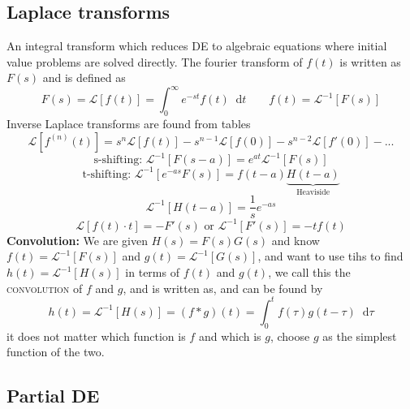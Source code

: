 \documentclass[a4paper, 10pt]{article}
\newcommand*\diff{\mathop{}\!\mathrm{d}}
\begin{document}
\begin{multicols*}{3}
\begin{mdframed}
\subsection*{Laplace transforms}
\end{mdframed}
An integral transform which reduces DE to algebraic equations where initial value problems are solved directly. The fourier transform of $f(t)$ is written as $F(s)$ and is defined as
$$ F(s) = \mathcal{L}\left[ f(t) \right] = \int_0^\infty e^{-st} f(t) \diff t \qquad f(t) = \mathcal{L}^{-1}\left[ F(s) \right]$$
Inverse Laplace transforms are found from tables
$$ \mathcal{L}\left[ f^{(n)}(t) \right] = s^n\mathcal{L}\left[ f(t) \right]-s^{n-1}\mathcal{L}\left[ f(0) \right]-s^{n-2}\mathcal{L}\left[ f'(0) \right] - ...$$
$$ \text{s-shifting: }\mathcal{L}^{-1}\left[ F(s-a) \right] = e^{at}\mathcal{L}^{-1}\left[ F(s)\right] $$
$$ \text{t-shifting: }\mathcal{L}^{-1}\left[ e^{-as}F(s) \right] = f(t-a)\underbrace{H(t-a)}_{\text{Heaviside}}$$
$$ \mathcal{L}^{-1}\left[ H(t-a) \right] = \frac{1}{s}e^{-as}$$
$$ \mathcal{L}\left[ f(t)\cdot t \right] = -F'(s) \text{  or  } \mathcal{L}^{-1}\left[F'(s)\right] = -tf(t)$$
\textbf{Convolution:}
We are given $H(s) = F(s)G(s)$ and know $f(t) = \mathcal{L}^{-1}\left[F(s)\right]$ and $g(t) = \mathcal{L}^{-1}\left[G(s)\right]$, and want to use tihs to find $h(t) = \mathcal{L}^{-1}\left[H(s)\right]$ in terms of $f(t)$ and $g(t)$, we call this the \textsc{convolution} of $f$ and $g$, and is written as, and can be found by
$$h(t) = \mathcal{L}^{-1}\left[H(s)\right] = \left( f*g\right)(t) = \int_0^t f(\tau)g(t-\tau) \diff \tau$$
it does not matter which function is $f$ and which is $g$, choose $g$ as the simplest function of the two.


\begin{mdframed}
\subsection*{Partial DE}
\end{mdframed}

\end{multicols*}
\end{document}
